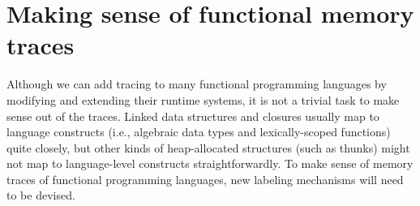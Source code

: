 \section{Making sense of functional memory traces}
Although we can add tracing to many functional programming languages by modifying and extending their runtime systems, it is not a trivial task to make sense out
of the traces. Linked data structures and closures usually map to language constructs (i.e., algebraic data types and lexically-scoped functions) quite closely,
but other kinds of heap-allocated structures (such as thunks) might not map to language-level constructs straightforwardly. To make sense of memory traces of
functional programming languages, new labeling mechanisms will need to be devised.
